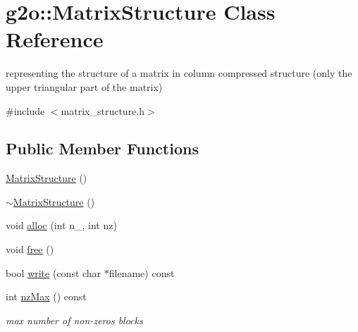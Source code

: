 \hypertarget{classg2o_1_1MatrixStructure}{}\section{g2o\+:\+:Matrix\+Structure Class Reference}
\label{classg2o_1_1MatrixStructure}


representing the structure of a matrix in column compressed structure (only the upper triangular part of the matrix)  




{\ttfamily \#include $<$matrix\+\_\+structure.\+h$>$}

\subsection*{Public Member Functions}
\begin{DoxyCompactItemize}
\item 
\hyperlink{classg2o_1_1MatrixStructure_aa016529c47ff242c5547301041360b5e}{Matrix\+Structure} ()
\item 
\hyperlink{classg2o_1_1MatrixStructure_a64d784cf6c4415145e012368ec4d42c1}{$\sim$\+Matrix\+Structure} ()
\item 
void \hyperlink{classg2o_1_1MatrixStructure_aeda2f4fd97499545773af331cd2c10f2}{alloc} (int n\+\_\+, int nz)
\item 
void \hyperlink{classg2o_1_1MatrixStructure_a4bc9281fa8ae82dab908506fe0819498}{free} ()
\item 
bool \hyperlink{classg2o_1_1MatrixStructure_ac8fbebec703b3a4255025445e640314e}{write} (const char $\ast$filename) const 
\item 
int \hyperlink{classg2o_1_1MatrixStructure_a358efab55a4eee51f7dfaab21d7d9c11}{nz\+Max} () const 
\begin{DoxyCompactList}\small\item\em max number of non-\/zeros blocks \end{DoxyCompactList}\end{DoxyCompactItemize}
